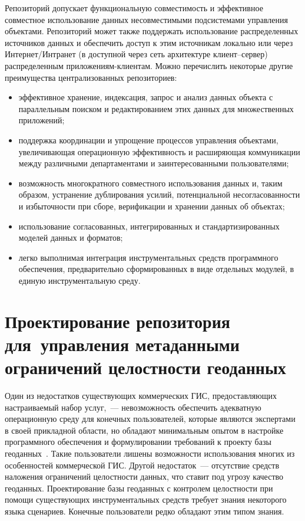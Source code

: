 \begin{multicols}{2}
      Репозиторий допускает функциональную совместимость и эффективное 
совместное использование данных несовместимыми подсистемами управления объектами. 
Репозиторий может также поддержать использование распределенных источников данных 
и обеспечить доступ к этим источникам локально или через Ин\-тер\-нет/Интра\-нет (в 
доступной через сеть архитектуре кли\-ент--сер\-вер) распределенным приложениям-кли\-ен\-там. 
Можно перечислить некоторые другие преимущества централизованных 
репозиториев:
      \begin{itemize}
\item эффективное хранение, индексация, запрос и анализ данных объекта с 
параллельным поиском и редактированием этих данных для множественных 
приложений;
\item поддержка координации и упрощение процессов управления объектами, 
уве\-ли\-чи\-ва\-ющая операционную эффективность и рас\-ши\-ря\-ющая коммуникации между 
различными департаментами и заинтересованными пользовате\-лями;
\item возможность многократного совместного использования данных и, таким 
образом, устранение дублирования усилий, потенциальной несогласованности и 
избыточности при сборе, верификации и хранении данных об объектах;
\item использование согласованных, интегрированных и стандартизированных 
моделей данных и форматов;
\item легко выполнимая интеграция инструментальных средств программного 
обеспечения, предварительно сформированных в виде отдельных модулей, в единую 
инструментальную среду.
\end{itemize}

\section{Проектирование репозитория для~управления метаданными 
ограничений целостности геоданных}
      
      Один из недостатков существующих коммерческих ГИС, предоставляющих 
настраиваемый набор услуг,~--- невозможность обеспечить адекватную операционную 
среду для конечных пользователей, которые являются экспертами в своей прикладной\linebreak 
области, но обладают минимальным опытом в настройке программного обеспечения и 
формулировании требований к проекту базы геоданных~\cite{6dul}.\linebreak
Такие пользователи 
лишены возможности использования многих из особенностей коммерческой ГИС. Другой 
недостаток~--- отсутствие средств наложения ограничений целостности данных, что 
ставит под угрозу качество геоданных. Проектирование базы геоданных с контролем 
целостности при помощи существующих инструментальных средств требует знания 
некоторого языка сценариев. Конечные пользователи редко обладают этим типом знания.
      

\end{multicols}
